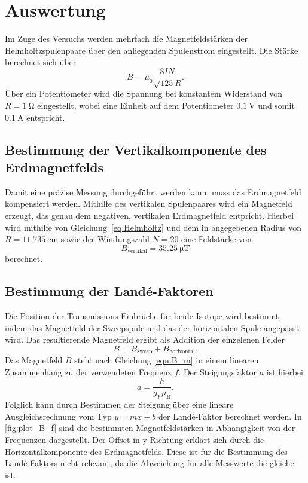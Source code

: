 \section{Auswertung}
\label{sec:Auswertung}
Im Zuge des Versuchs werden mehrfach die Magnetfeldstärken der Helmholtzspulenpaare über den anliegenden Spulenstrom eingestellt. Die Stärke berechnet sich
über 
\begin{equation}
  \label{eq:Helmholtz}
  B = \mu_0 \frac{8 I N}{\sqrt{125} R}.
\end{equation}
Über ein Potentiometer wird die Spannung bei konstantem Widerstand von $R=\qty{1}{\ohm}$ eingestellt, wobei eine Einheit auf dem Potentiometer $\qty{0,1}{\volt}$
und somit $\qty{0,1}{\ampere}$ entspricht.

\subsection{Bestimmung der Vertikalkomponente des Erdmagnetfelds}
Damit eine präzise Messung durchgeführt werden kann, muss das Erdmagnetfeld kompensiert werden. Mithilfe des vertikalen Spulenpaares wird ein Magnetfeld erzeugt,
das genau dem negativen, vertikalen Erdmagnetfeld entpricht. Hierbei wird mithilfe von Gleichung~\eqref{eq:Helmholtz} und dem in \cite{v21} angegebenen
Radius von $R=\qty{11,735}{\centi\metre}$ sowie der Windungszahl $N=20$ eine Feldstärke von
\begin{equation*}
  B_{\text{vertikal}} = \qty{35.25}{\micro\tesla}
\end{equation*}
berechnet.

\subsection{Bestimmung der Landé-Faktoren}
\label{sec:Landéfaktoren}
Die Position der Transmissions-Einbrüche für beide Isotope wird bestimmt, indem das Magnetfeld der Sweepspule und das der horizontalen Spule angepasst wird.
Das resultierende Magnetfeld ergibt als Addition der einzelenen Felder
\begin{equation*}
  B = B_{\text{sweep}} + B_{\text{horizontal}}.
\end{equation*}
Das Magnetfeld $B$ steht nach Gleichung \eqref{eqn:B_m} in einem linearen Zusammenhang zu der verwendeten Frequenz $f$. Der Steigungsfaktor $a$ ist
hierbei
\begin{equation*}
  a = \frac{h}{g_F \mu_{\text{B}}}.
\end{equation*}
Folglich kann durch Bestimmen der Steigung über eine lineare Ausgleichsrechnung vom Typ $y=mx+b$ der Landé-Faktor berechnet werden. In \autoref{fig:plot_B_f} sind
die bestimmten Magnetfeldstärken in Abhängigkeit von der Frequenzen dargestellt.
Der Offset in y-Richtung erklärt sich durch die Horizontalkomponente des Erdmagnetfelds. Diese ist für die Bestimmung des Landé-Faktors nicht relevant, da die 
Abweichung für alle Messwerte die gleiche ist.

